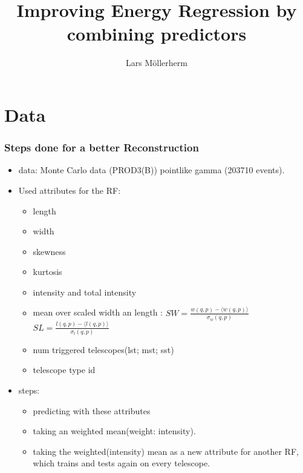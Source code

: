 \documentclass[aspectratio=1610, professionalfonts, 9pt]{beamer}
\title{Improving Energy Regression by combining predictors}
\author[L.~Möllerherm]{Lars Möllerherm}
\institute[Experimentelle Physik Vb]{Experimentelle Physik Vb \\  Fakultät Physik}
\begin{document}
\maketitle

\section{Data}
  \begin{frame}
    \frametitle{Steps done for a better Reconstruction}
    \begin{itemize}
      \item data: Monte Carlo data (PROD3(B)) \- pointlike gamma (203710 events).

      \item Used attributes for the RF:
      \begin{itemize}
        \item length
        \item width
        \item skewness
        \item kurtosis
        \item intensity and total intensity
        \item mean over scaled width an length \cite[104]{HESS}: $SW =\frac{w(q,p)-\langle w(q,p) \rangle}{\sigma_w(q,p)}$  $SL = \frac{l(q,p)-\langle l(q,p) \rangle}{\sigma_l(q,p)}$
        \item num triggered telescopes(lst; mst; sst)
        \item telescope type id
      \end{itemize}

      \item steps:
      \begin{itemize}
        \item predicting with these attributes
        \item taking an weighted mean(weight: intensity).
        \item taking the weighted(intensity) mean as a new attribute for another RF, which trains and tests again on every telescope.
      \end{itemize}
    \end{itemize}

  \end{frame}
\end{document}
